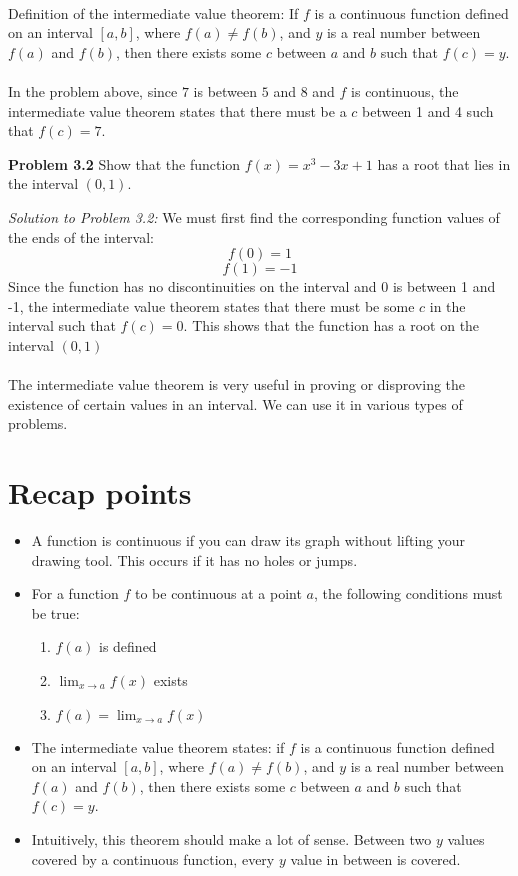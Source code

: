 \documentclass[11pt]{scrartcl}
\begin{document}
\noindent\\
Definition of the intermediate value theorem: If $f$ is a continuous function defined on an interval $[a,b]$, where $f(a)\neq f(b)$, and $y$ is a real number between $f(a)$ and $f(b)$, then there exists some $c$ between $a$ and $b$ such that $f(c)=y$. \\
\noindent\\
In the problem above, since $7$ is between $5$ and $8$ and $f$ is continuous, the intermediate value theorem states that there must be a $c$ between 1 and 4 such that $f(c)=7$.\\
\begin{tcolorbox}
[colback=purple!5!white,colframe=purple!75!black]
\textbf{Problem 3.2} Show that the function $f(x)=x^3-3x+1$ has a root that lies in the interval $(0,1)$. 
\end{tcolorbox}
\noindent
\textit{Solution to Problem 3.2:} We must first find the corresponding function values of the ends of the interval:
$$f(0)=1$$
$$f(1)=-1$$
Since the function has no discontinuities on the interval and 0 is between 1 and -1, the intermediate value theorem states that there must be some $c$ in the interval such that $f(c)=0$. This shows that the function has a root on the interval $(0,1)$\\
\noindent\\
The intermediate value theorem is very useful in proving or disproving the existence of certain values in an interval. We can use it in various types of problems. 
\section{Recap points}
\begin{itemize}
    \item A function is continuous if you can draw its graph without lifting your drawing tool. This occurs if it has no holes or jumps. 
    \item For a function $f$ to be continuous at a point $a$, the following conditions must be true:
\begin{enumerate}
    \item $f(a)$ is defined 
    \item $\lim_{x \to a} f(x)$ exists
    \item $f(a)=\lim_{x \to a} f(x)$
\end{enumerate} 
    \item The intermediate value theorem states: if $f$ is a continuous function defined on an interval $[a,b]$, where $f(a)\neq f(b)$, and $y$ is a real number between $f(a)$ and $f(b)$, then there exists some $c$ between $a$ and $b$ such that $f(c)=y$.  
    \item Intuitively, this theorem should make a lot of sense. Between two $y$ values covered by a continuous function, every $y$ value in between is covered. 
\end{itemize}
\end{document}
